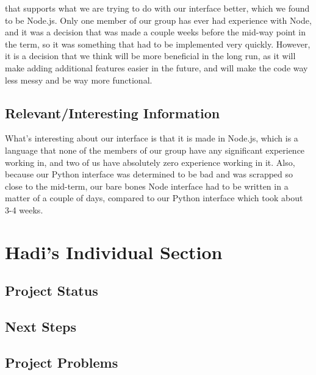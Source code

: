 \documentclass[onecolumn, draftclsnofoot,10pt, compsoc]{IEEEtran}
\begin{document}
that supports what we are trying to do with our interface better, which we found to be Node.js. Only one member of our group has ever had experience with Node, and it was a decision that was made a couple weeks before the mid-way point in the term, so it was something that had to be implemented very quickly. However, it is a decision that we think will be more beneficial in the long run, as it will make adding additional features easier in the future, and will make the code way less messy and be way more functional.

\subsection{Relevant/Interesting Information}

What's interesting about our interface is that it is made in Node.js, which is a language that none of the members of our group have any significant experience working in, and two of us have absolutely zero experience working in it. Also, because our Python interface was determined to be bad and was scrapped so close to the mid-term, our bare bones Node interface had to be written in a matter of a couple of days, compared to our Python interface which took about 3-4 weeks.

\section{Hadi's Individual Section}
\subsection{Project Status}


\subsection{Next Steps}


\subsection{Project Problems}


\end{document}
